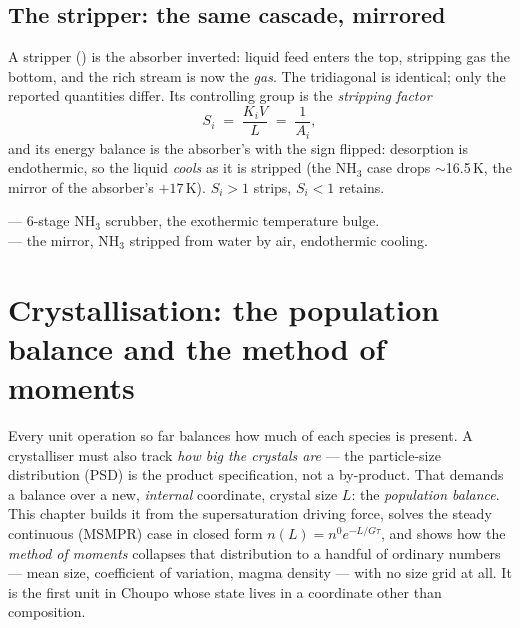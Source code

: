 \documentclass[11pt,a4paper]{article}
\begin{document}
\subsection{The stripper: the same cascade, mirrored}

A stripper () is the absorber inverted:
liquid feed enters the top, stripping gas the bottom, and the rich
stream is now the \emph{gas}.  The tridiagonal is identical; only the
reported quantities differ.  Its controlling group is the
\emph{stripping factor}
\begin{equation}
   S_i \;=\; \frac{K_i V}{L} \;=\; \frac{1}{A_i},
\end{equation}
and its energy balance is the absorber's with the sign flipped:
desorption is endothermic, so the liquid \emph{cools} as it is
stripped (the NH$_3$ case drops $\sim$16.5\,K, the mirror of the
absorber's $+17$\,K).  $S_i>1$ strips, $S_i<1$ retains.

\begin{tutoriallink}
 --- 6-stage NH$_3$
scrubber, the exothermic temperature bulge. \\
 --- the mirror, NH$_3$
stripped from water by air, endothermic cooling.
\end{tutoriallink}

\section{Crystallisation: the population balance and the method of
moments}\label{ch:crystalliser}

\begin{whatyoulllearn}
Every unit operation so far balances how much of each species is
present.  A crystalliser must also track \emph{how big the crystals
are} --- the particle-size distribution (PSD) is the product
specification, not a by-product.  That demands a balance over a new,
\emph{internal} coordinate, crystal size $L$: the \emph{population
balance}.  This chapter builds it from the supersaturation driving
force, solves the steady continuous (MSMPR) case in closed form
$n(L)=n^0 e^{-L/G\tau}$, and shows how the \emph{method of moments}
collapses that distribution to a handful of ordinary numbers --- mean
size, coefficient of variation, magma density --- with no size grid at
all.  It is the first unit in Choupo whose state lives in a coordinate
other than composition.
\end{whatyoulllearn}
\end{document}
